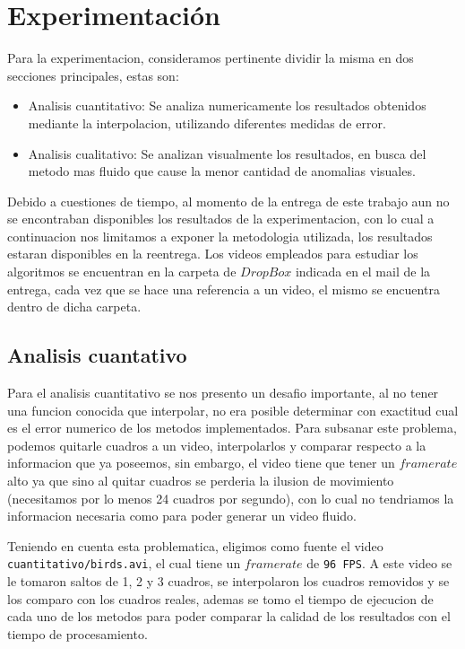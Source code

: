 \section{Experimentación}

Para la experimentacion, consideramos pertinente dividir la misma en dos secciones principales, estas son:

\begin{itemize}
	\item Analisis cuantitativo: Se analiza numericamente los resultados obtenidos mediante la interpolacion, utilizando diferentes medidas de error.
	\item Analisis cualitativo: Se analizan visualmente los resultados, en busca del metodo mas fluido que cause la menor cantidad de anomalias visuales.
\end{itemize}

Debido a cuestiones de tiempo, al momento de la entrega de este trabajo aun no se encontraban disponibles los resultados de la experimentacion, con lo cual a continuacion nos limitamos a exponer la metodologia utilizada, los resultados estaran disponibles en la reentrega. Los videos empleados para estudiar los algoritmos se encuentran en la carpeta de $DropBox$ indicada en el mail de la entrega, cada vez que se hace una referencia a un video, el mismo se encuentra dentro de dicha carpeta.

\subsection{Analisis cuantativo}

Para el analisis cuantitativo se nos presento un desafio importante, al no tener una funcion conocida que interpolar, no era posible determinar con exactitud cual es el error numerico de los metodos implementados. Para subsanar este problema, podemos quitarle cuadros a un video, interpolarlos y comparar respecto a la informacion que ya poseemos, sin embargo, el video tiene que tener un $framerate$ alto ya que sino al quitar cuadros se perderia la ilusion de movimiento (necesitamos por lo menos 24 cuadros por segundo), con lo cual no tendriamos la informacion necesaria como para poder generar un video fluido.

Teniendo en cuenta esta problematica, eligimos como fuente el video \texttt{cuantitativo/birds.avi}, el cual tiene un $framerate$ de \texttt{96 FPS}. A este video se le tomaron saltos de 1, 2 y 3 cuadros, se interpolaron los cuadros removidos y se los comparo con los cuadros reales, ademas se tomo el tiempo de ejecucion de cada uno de los metodos para poder comparar la calidad de los resultados con el tiempo de procesamiento.

